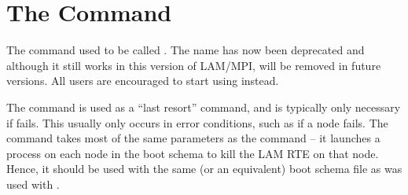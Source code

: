
\section{The  Command}
\label{sec:commands-lamwipe}

The  command used to be called .  The name
 has now been deprecated and although it still works in
this version of LAM/MPI, will be removed in future versions.  All
users are encouraged to start using  instead.

The  command is used as a ``last resort'' command, and is
typically only necessary if  fails.  This usually only
occurs in error conditions, such as if a node fails.  The
 command takes most of the same parameters as the
 command -- it launches a process on each node in the
boot schema to kill the LAM RTE on that node.  Hence, it should be
used with the same (or an equivalent) boot schema file as was used
with .

